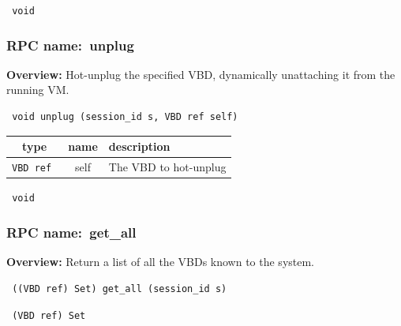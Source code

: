 \vspace{0.3cm}

{\tt 
void
}



\vspace{0.3cm}
\vspace{0.3cm}
\vspace{0.3cm}
\subsubsection{RPC name:~unplug}

{\bf Overview:} 
Hot-unplug the specified VBD, dynamically unattaching it from the running
VM.

\begin{verbatim} void unplug (session_id s, VBD ref self)\end{verbatim}



 
\vspace{0.3cm}
\begin{tabular}{|c|c|p{7cm}|}
 \hline
{\bf type} & {\bf name} & {\bf description} \\ \hline
{\tt VBD ref } & self & The VBD to hot-unplug \\ \hline 

\end{tabular}

\vspace{0.3cm}

{\tt 
void
}



\vspace{0.3cm}
\vspace{0.3cm}
\vspace{0.3cm}
\subsubsection{RPC name:~get\_all}

{\bf Overview:} 
Return a list of all the VBDs known to the system.

\begin{verbatim} ((VBD ref) Set) get_all (session_id s)\end{verbatim}


\vspace{0.3cm}

{\tt 
(VBD ref) Set
}


